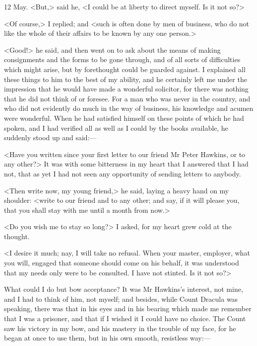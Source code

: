 \begin{diary}{12 May.}
<But,> said he, <I could be at liberty to direct myself. Is it not so?>

<Of course,> I replied; and <such is often done by men of business, who do not like the whole of their affairs to be known by any one person.>

<Good!> he said, and then went on to ask about the means of making consignments and the forms to be gone through, and of all sorts of difficulties which might arise, but by forethought could be guarded against. I explained all these things to him to the best of my ability, and he certainly left me under the impression that he would have made a wonderful solicitor, for there was nothing that he did not think of or foresee. For a man who was never in the country, and who did not evidently do much in the way of business, his knowledge and acumen were wonderful. When he had satisfied himself on these points of which he had spoken, and I had verified all as well as I could by the books available, he suddenly stood up and said:—

<Have you written since your first letter to our friend Mr Peter Hawkins, or to any other?> It was with some bitterness in my heart that I answered that I had not, that as yet I had not seen any opportunity of sending letters to anybody.

<Then write now, my young friend,> he said, laying a heavy hand on my shoulder: <write to our friend and to any other; and say, if it will please you, that you shall stay with me until a month from now.>

<Do you wish me to stay so long?> I asked, for my heart grew cold at the thought.

<I desire it much; nay, I will take no refusal. When your master, employer, what you will, engaged that someone should come on his behalf, it was understood that my needs only were to be consulted. I have not stinted. Is it not so?>

What could I do but bow acceptance? It was Mr Hawkins's interest, not mine, and I had to think of him, not myself; and besides, while Count Dracula was speaking, there was that in his eyes and in his bearing which made me remember that I was a prisoner, and that if I wished it I could have no choice. The Count saw his victory in my bow, and his mastery in the trouble of my face, for he began at once to use them, but in his own smooth, resistless way:—


\end{diary}
